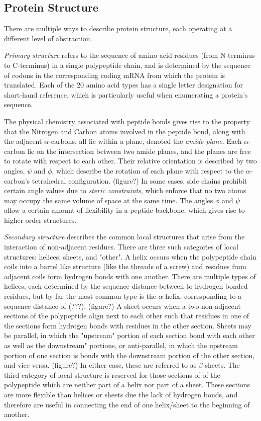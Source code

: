 \subsection{Protein Structure}

There are multiple ways to describe protein structure, each operating at a different level of abstraction. 

\textit{Primary structure} refers to the sequence of amino acid residues (from N-terminus to C-terminus) in a single polypeptide chain, and is determined by the sequence of codons in the corresponding coding mRNA from which the protein is translated. 
Each of the 20 amino acid types has a single letter designation for short-hand reference, which is particularly useful when enumerating a protein's sequence.

The physical chemistry associated with peptide bonds gives rise to the property that the Nitrogen and Carbon atoms involved in the peptide bond, along with the adjacent $\alpha$-carbons, all lie within a plane, denoted the \textit{amide plane}.
Each $\alpha$-carbon lie on the intersection between two amide planes, and the planes are free to rotate with respect to each other. 
Their relative orientation is described by two angles, $\psi$ and $\phi$, which describe the rotation of each plane with respect to the $\alpha$-carbon's tetrahedral configuration. (figure?)
In some cases, side chains prohibit certain angle values due to \textit{steric constraints}, which enforce that no two atoms may occupy the same volume of space at the same time.
The angles $\phi$ and $\psi$ allow a certain amount of flexibility in a peptide backbone, which gives rise to higher order structures.

\textit{Secondary structure} describes the common local structures that arise from the interaction of non-adjacent residues.
There are three such categories of local structures: helices, sheets, and "other".
A helix occurs when the polypeptide chain coils into a barrel like structure (like the threads of a screw) and residues from adjacent coils form hydrogen bonds with one another.
There are multiple types of helices, each determined by the sequence-distance between to hydrogen bonded residues, but by far the most common type is the $\alpha$-helix, corresponding to a sequence distance of (???). (figure?)
A sheet occurs when a two non-adjacent sections of the polypeptide align next to each other such that residues in one of the sections form hydrogen bonds with residues in the other section.
Sheets may be parallel, in which the "upstream" portion of each section bond with each other as well as the downstream" portions, or anti-parallel, in which the upstream portion of one section is bonds with the downstream portion of the other section, and vice versa. (figure?)
In either case, these are referred to as $\beta$-sheets. 
The third category of local structure is reserved for those sections of of the polypeptide which are neither part of a helix nor part of a sheet.
These sections are more flexible than helices or sheets due the lack of hydrogen bonds, and therefore are useful in connecting the end of one helix/sheet to the beginning of another. 

